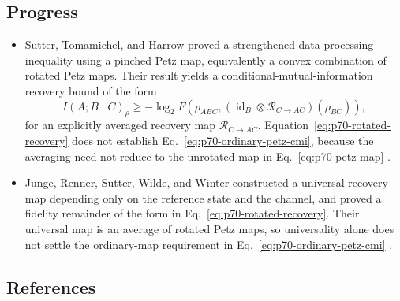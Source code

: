 \subsection*{Progress}

\begin{itemize}
  \item Sutter, Tomamichel, and Harrow proved a strengthened data-processing
  inequality using a pinched Petz map, equivalently a convex combination of
  rotated Petz maps.  Their result yields a conditional-mutual-information
  recovery bound of the form
  \begin{equation}
    I(A;B\mid C)_\rho
    \geq-\log_2 F\!\left(
      \rho_{ABC},
      (\operatorname{id}_B\otimes\mathcal R_{C\to AC})(\rho_{BC})
    \right),
    \label{eq:p70-rotated-recovery}
  \end{equation}
  for an explicitly averaged recovery map $\mathcal R_{C\to AC}$.
  Equation~\eqref{eq:p70-rotated-recovery} does not establish
  Eq.~\eqref{eq:p70-ordinary-petz-cmi}, because the averaging need not reduce
  to the unrotated map in Eq.~\eqref{eq:p70-petz-map}
  .

  \item Junge, Renner, Sutter, Wilde, and Winter constructed a universal
  recovery map depending only on the reference state and the channel, and
  proved a fidelity remainder of the form in
  Eq.~\eqref{eq:p70-rotated-recovery}.  Their universal map is an average of
  rotated Petz maps, so universality alone does not settle the ordinary-map
  requirement in Eq.~\eqref{eq:p70-ordinary-petz-cmi}
  .
\end{itemize}

\subsection*{References}

